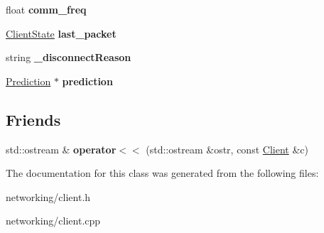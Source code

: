 \begin{DoxyCompactItemize}
\item 
float {\bfseries comm\+\_\+freq}\hypertarget{classClient_a4098c372388382054cc59d66508b23a6}{}\label{classClient_a4098c372388382054cc59d66508b23a6}

\item 
\hyperlink{classClientState}{Client\+State} {\bfseries last\+\_\+packet}\hypertarget{classClient_aa7e640392046d207d5239872fd11de4c}{}\label{classClient_aa7e640392046d207d5239872fd11de4c}

\item 
string {\bfseries \+\_\+disconnect\+Reason}\hypertarget{classClient_ae1990fa00d6522bb3ec6f604c3376c30}{}\label{classClient_ae1990fa00d6522bb3ec6f604c3376c30}

\item 
\hyperlink{classPrediction}{Prediction} $\ast$ {\bfseries prediction}\hypertarget{classClient_a584915659c6c484055aa83392a6eccbb}{}\label{classClient_a584915659c6c484055aa83392a6eccbb}

\end{DoxyCompactItemize}
\subsection*{Friends}
\begin{DoxyCompactItemize}
\item 
std\+::ostream \& {\bfseries operator$<$$<$} (std\+::ostream \&ostr, const \hyperlink{classClient}{Client} \&c)\hypertarget{classClient_a76d223a46be2da06b0ef590a04163c52}{}\label{classClient_a76d223a46be2da06b0ef590a04163c52}

\end{DoxyCompactItemize}


The documentation for this class was generated from the following files\+:\begin{DoxyCompactItemize}
\item 
networking/client.\+h\item 
networking/client.\+cpp\end{DoxyCompactItemize}
